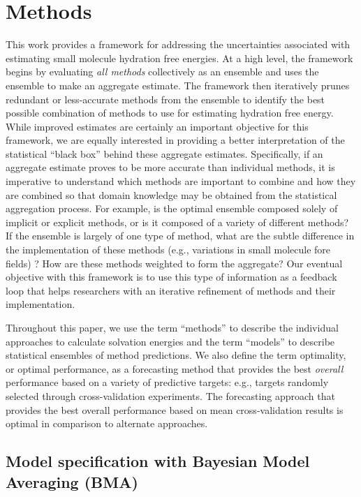 \documentclass[journal=jpcbfk, manuscript=article]{achemso}
\newcommand{\+}[1]{\ensuremath{\mathbf{#1}}}
\begin{document}
\section{Methods} \label{MethodMain}

This work provides a framework for addressing the uncertainties associated with estimating  small molecule hydration free energies. 
At a high level, the framework begins by evaluating \emph{all methods} collectively as an ensemble and uses the ensemble to make an aggregate estimate. 
The framework then iteratively prunes redundant or less-accurate methods from the ensemble to identify the best possible combination of methods to use for estimating hydration free energy.
While improved estimates are certainly an important objective for this framework, we are equally interested in providing a better interpretation of the statistical ``black box'' behind these aggregate estimates. 
Specifically, if an aggregate estimate proves to be more accurate than individual methods, it is imperative to understand which methods are important to combine and how they are combined so that domain knowledge may be obtained from the statistical aggregation process.
For example, is the optimal ensemble composed solely of implicit or explicit methods, or is it composed of a variety of different methods?
If the ensemble is largely of one type of method, what are the subtle difference in the implementation of these methods (e.g., variations in small molecule fore fields) ? 
How are these methods weighted to form the aggregate?
Our eventual objective with this framework is to use this type of information as a feedback loop that helps researchers with an iterative refinement of methods and their implementation.

Throughout this paper, we use the term ``methods'' to describe the individual approaches to calculate solvation energies and the term ``models'' to describe statistical ensembles of method predictions.  
We also define the term optimality, or optimal performance, as a forecasting method that provides the best \emph{overall} performance based on a variety of predictive targets: e.g., targets randomly selected through cross-validation experiments.
The forecasting approach that provides the best overall performance based on mean cross-validation results is optimal in comparison to alternate approaches.

\subsection{Model specification with Bayesian Model Averaging (BMA)} \label{Method} 
\end{document}
